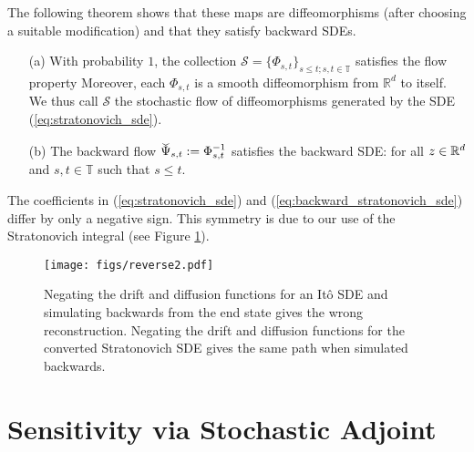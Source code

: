 \documentclass[twoside]{article}
\begin{document}
The following theorem shows that these maps are diffeomorphisms (after choosing a suitable modification) and that they satisfy backward SDEs.
\begin{theo} \label{thm:stochastic_flow}
\begin{enumerate}
\item[(a)] With probability $1$, the collection $\mathcal{S} = \{ \Phi_{s, t}\}_{s \le t; s, t \in \mathbb{T}}$ satisfies the flow property
Moreover, each $\Phi_{s, t}$ is a smooth diffeomorphism from $\mathbb{R}^d$ to itself. 
We thus call $\mathcal{S}$ the stochastic flow of diffeomorphisms generated by the SDE (\ref{eq:stratonovich_sde}).
\item[(b)] The backward flow $\widecheck{\Psi}_{s, t} := \Phi_{s, t}^{-1}$ satisfies the backward SDE:
for all $z \in \mathbb{R}^d$ and $s, t \in \mathbb{T}$ such that $s \le t$.
\end{enumerate}
\end{theo}

The coefficients in (\ref{eq:stratonovich_sde}) and (\ref{eq:backward_stratonovich_sde}) differ by only a negative sign. This symmetry is due to our use of the Stratonovich integral (see Figure \ref{fig:stochastic.flow}). 


\begin{figure}[ht]
\centering
\texttt{[image: figs/reverse2.pdf]}


\caption{
Negating the drift and diffusion functions for an It\^o SDE and simulating backwards from the end state gives the wrong reconstruction. 
Negating the drift and diffusion functions for the converted Stratonovich SDE gives the same path when simulated backwards. 
} \label{fig:stochastic.flow}
\vspace{-4mm}
\end{figure}
 \section{Sensitivity via Stochastic Adjoint} \label{sec:adjoint}
\end{document}
